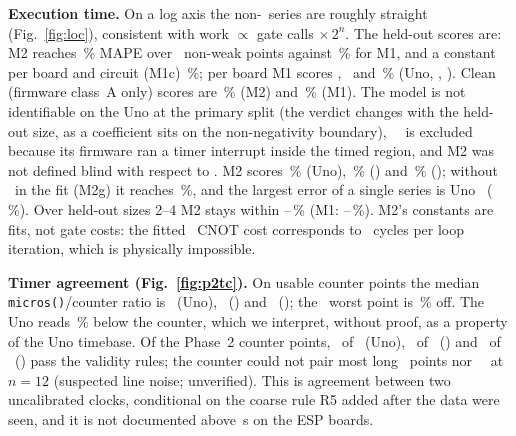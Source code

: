 \documentclass[conference,a4paper,10pt]{IEEEtran}
\begin{document}
\begin{table}[t]
\caption{Predicted versus measured memory wall for \hall, \bell, \qft\ ($B$ in bytes, read at $n=2$). ``wrong'': the prediction exceeds the last working $n$.}\label{tab:mem}
\centering\footnotesize
\resizebox{\columnwidth}{!}{}
\end{table}

\textbf{Execution time.} On a log axis the non-\grover\ series are roughly straight (Fig.~\ref{fig:loc}), consistent with work $\propto$ gate calls $\times\,2^n$. The held-out scores are: M2 reaches \MapeTwo\,\% MAPE over \NTestTwo\ non-weak points against \MapeOne\,\% for M1, and a constant per board and circuit (M1c) \MapeOneCOne\,\%; per board M1 scores \MapeOneUno, \MapeOneEspLo\ and \MapeOneEspHi\,\% (Uno, \espA, \espB). Clean (firmware class~A only) scores are \MapeTwoClean\,\% (M2) and \MapeOneClean\,\% (M1). The model is not identifiable on the Uno at the primary split (the verdict changes with the held-out size, as a coefficient sits on the non-negativity boundary), \espA\ \grover\ is excluded because its firmware ran a timer interrupt inside the timed region, and M2 was not defined blind with respect to \grover. M2 scores \MapeTwoUno\,\% (Uno), \MapeTwoEspLo\,\% (\espA) and \MapeTwoEspHi\,\% (\espB); without \grover\ in the fit (M2g) it reaches \MapeTwoG\,\%, and the largest error of a single series is Uno \qft\ (\MapeTwoUnoQft\,\%). Over held-out sizes 2--4 M2 stays within \SensTwoAllMin--\SensTwoAllMax\,\% (M1: \SensOneAllTwo--\SensOneAllFour\,\%). M2's constants are fits, not gate costs: the fitted \espA\ CNOT cost corresponds to \CyclesCnotEspLo\ cycles per loop iteration, which is physically impossible.

\textbf{Timer agreement (Fig.~\ref{fig:p2tc}).} On usable counter points the median \texttt{micros()}/counter ratio is \RatioMedUno\ (Uno), \RatioMedEspLo\ (\espA) and \RatioMedEspHi\ (\espB); the \espB\ worst point is \EspHiWorstPct\,\% off. The Uno reads \UnoBelowPct\,\% below the counter, which we interpret, without proof, as a property of the Uno timebase. Of the Phase~2 counter points, \UsableNUno\ of \RecordedNUno\ (Uno), \UsableNEspLo\ of \RecordedNEspLo\ (\espA) and \UsableNEspHi\ of \RecordedNEspHi\ (\espB) pass the validity rules; the counter could not pair most long \espA\ points nor \espB\ \grover\ at $n=12$ (suspected line noise; unverified). This is agreement between two uncalibrated clocks, conditional on the coarse rule R5 added after the data were seen, and it is not documented above \RatioLongSEspLo\,s on the ESP boards.
\end{document}
